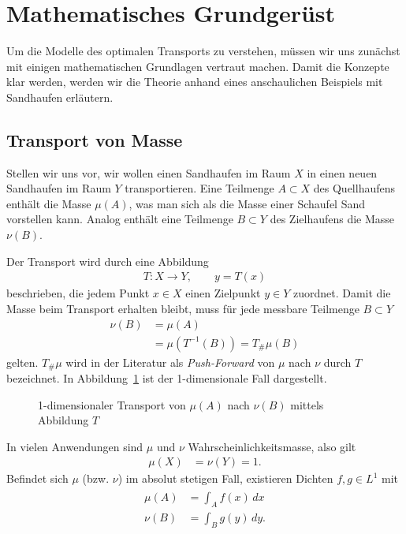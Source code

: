 %
%
%
%
\section{Mathematisches Grundgerüst\label{mongekant:section:teil0}}

Um die Modelle des optimalen Transports zu verstehen,
müssen wir uns zunächst mit einigen mathematischen Grundlagen vertraut machen.
Damit die Konzepte klar werden,
werden wir die Theorie anhand eines anschaulichen Beispiels mit Sandhaufen erläutern.

\subsection{Transport von Masse\label{mongekant:subection:transport}}
Stellen wir uns vor,
wir wollen einen Sandhaufen im Raum $X$
in einen neuen Sandhaufen im Raum $Y$ transportieren.
Eine Teilmenge $A\subset X$ des Quellhaufens enthält die Masse $\mu(A)$,
was man sich als die Masse einer Schaufel Sand vorstellen kann.
Analog enthält eine Teilmenge $B\subset Y$ des Zielhaufens die Masse $\nu(B)$.

Der Transport wird durch eine Abbildung
\begin{align*}
T\colon X\to Y
,\qquad y=T(x)
\end{align*}
beschrieben,
die jedem Punkt $x\in X$ einen Zielpunkt $y\in Y$ zuordnet.
Damit die Masse beim Transport erhalten bleibt,
muss für jede messbare Teilmenge $B\subset Y$
\begin{align*}
\nu(B)
&=
\mu(A)
\\
&=
\mu\left(T^{-1}(B)\right)
=
T_{\#}\mu(B)
\end{align*}
gelten.
$T_{\#}\mu$ wird in der Literatur als \emph{Push-Forward} von $\mu$ nach $\nu$ durch $T$ bezeichnet.
In Abbildung~\ref{mongekant:fig:optimal_transport} ist der 1-dimensionale Fall dargestellt.

\begin{figure}
\centering

\caption{1-dimensionaler Transport von $\mu(A)$ nach $\nu(B)$ mittels Abbildung $T$}
\label{mongekant:fig:optimal_transport}
\end{figure}

In vielen Anwendungen sind $\mu$ und $\nu$ Wahrscheinlichkeitsmasse,
also gilt
\begin{align*}
\mu(X)
&=
\nu(Y)
=
1
.
\end{align*}
Befindet sich $\mu$ (bzw. $\nu$) im absolut stetigen Fall,
existieren Dichten $f,g\in L^{1}$ mit
\begin{align}
\begin{aligned}
\mu(A)
&=
\int_A f(x) \, dx
\\
\nu(B)
&=
\int_B g(y) \, dy
.
\end{aligned}
\label{mongekant:eq:absolute_continuity}
\end{align}

